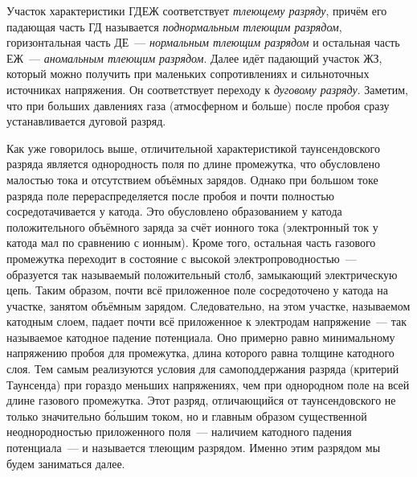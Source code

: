 Участок характеристики ГДЕЖ соответствует \textit{тлеющему разряду}, причём его падающая часть ГД называется
\textit{поднормальным тлеющим разрядом}, горизонтальная часть ДЕ~--- \textit{нормальным тлеющим разрядом} и остальная часть
ЕЖ~--- \textit{аномальным тлеющим разрядом}. Далее идёт падающий участок ЖЗ, который можно получить при маленьких
сопротивлениях и сильноточных источниках напряжения. Он соответствует переходу к \textit{дуговому разряду}. Заметим, что
при больших давлениях газа (атмосферном и больше) после пробоя сразу устанавливается дуговой разряд.

Как уже говорилось выше, отличительной характеристикой таунсендовского разряда является однородность поля по длине
промежутка, что обусловлено малостью тока и отсутствием объёмных зарядов. Однако при большом токе разряда поле
перераспределяется после пробоя и почти полностью сосредотачивается у катода. Это обусловлено образованием у катода
положительного объёмного заряда за счёт ионного тока (электронный ток у катода мал по сравнению с ионным). Кроме того,
остальная часть газового промежутка переходит в состояние с высокой электропроводностью~--- образуется так называемый
положительный столб, замыкающий электрическую цепь. Таким образом, почти всё приложенное поле сосредоточено у катода на
участке, занятом объёмным зарядом. Следовательно, на этом участке, называемом катодным слоем, падает почти всё
приложенное к электродам напряжение~--- так называемое катодное падение потенциала. Оно примерно равно минимальному
напряжению пробоя для промежутка, длина которого равна толщине катодного слоя. Тем самым реализуются условия для
самоподдержания разряда (критерий Таунсенда) при гораздо меньших напряжениях, чем при однородном поле на всей длине
газового промежутка. Этот разряд, отличающийся от таунсендовского не только значительно б\'ольшим током, но и главным
образом существенной неоднородностью приложенного поля~--- наличием катодного падения потенциала~--- и называется
тлеющим разрядом. Именно этим разрядом мы будем заниматься далее.


